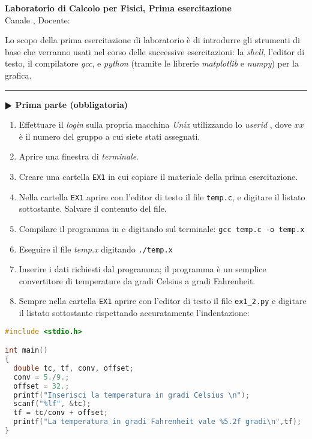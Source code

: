 \documentclass[11pt]{article}
\begin{document}
\pagestyle{empty}

\begin{center}
{\Large \bf  Laboratorio di Calcolo per Fisici, Prima esercitazione\\[2mm]}
{\large Canale \canale, Docente: \docente}
\end{center}
\vspace{4mm}

\begin{mdframed}[backgroundcolor=panna]
  Lo scopo della prima esercitazione di laboratorio \`e di introdurre gli strumenti di base che verranno usati nel corso delle successive esercitazioni:
  la {\em shell}, l'editor di testo, il compilatore {\em gcc}, e {\em python\/} (tramite le librerie
  {\em matplotlib\/} e {\em numpy\/}) per la grafica.
\\
\end{mdframed}
%
%

\hrule
\vspace{2mm}
\textbf{$\RHD$ Prima parte (obbligatoria)} 
\begin{enumerate}
\item Effettuare il {\em login\/} sulla propria macchina {\em Unix\/} utilizzando lo {\em userid\/} \texttt{\login}, 
dove $xx$ \`e il numero del gruppo a cui siete stati assegnati.
\item Aprire una finestra di {\em terminale}.
\item Creare una cartella  \texttt{EX1} in cui copiare il materiale della prima esercitazione.
\item Nella cartella \texttt{EX1} aprire con l'editor di testo il file \texttt{temp.c}, e digitare il listato sottostante. Salvare il contenuto del file.

\item Compilare il programma in c digitando sul terminale:
  \texttt{gcc temp.c -o temp.x}
\item Eseguire il file {\em temp.x\/} digitando \texttt{./temp.x}
\item Inserire i dati richiesti dal programma; il programma \`e un semplice convertitore di temperature da gradi Celsius a gradi Fahrenheit.
\item Sempre nella cartella \texttt{EX1} aprire con l'editor di testo il file \texttt{ex1\_2.py} e digitare il listato
  sottostante rispettando accuratamente l'indentazione:
\end{enumerate}
\begin{lstlisting}[caption={Programma \texttt{temp.c}},language=c]
#include <stdio.h>

int main()
{
  double tc, tf, conv, offset;
  conv = 5./9.;
  offset = 32.;
  printf("Inserisci la temperatura in gradi Celsius \n");
  scanf("%lf", &tc);
  tf = tc/conv + offset;
  printf("La temperatura in gradi Fahrenheit vale %5.2f gradi\n",tf);
}
\end{lstlisting}
\end{document}
